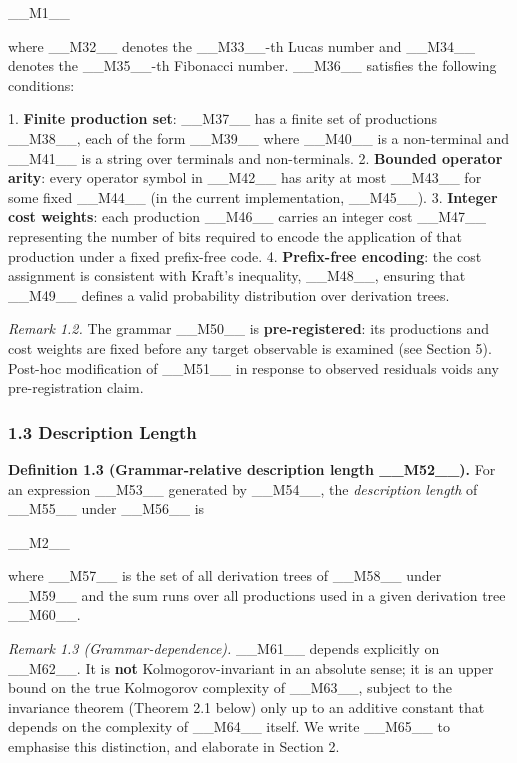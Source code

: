 \_\_M1\_\_

where \_\_M32\_\_ denotes the \_\_M33\_\_-th Lucas number and \_\_M34\_\_ denotes the \_\_M35\_\_-th Fibonacci number. \_\_M36\_\_ satisfies the following conditions:

1. \textbf{Finite production set}: \_\_M37\_\_ has a finite set of productions \_\_M38\_\_, each of the form \_\_M39\_\_ where \_\_M40\_\_ is a non-terminal and \_\_M41\_\_ is a string over terminals and non-terminals.
2. \textbf{Bounded operator arity}: every operator symbol in \_\_M42\_\_ has arity at most \_\_M43\_\_ for some fixed \_\_M44\_\_ (in the current implementation, \_\_M45\_\_).
3. \textbf{Integer cost weights}: each production \_\_M46\_\_ carries an integer cost \_\_M47\_\_ representing the number of bits required to encode the application of that production under a fixed prefix-free code.
4. \textbf{Prefix-free encoding}: the cost assignment is consistent with Kraft's inequality, \_\_M48\_\_, ensuring that \_\_M49\_\_ defines a valid probability distribution over derivation trees.

\textit{Remark 1.2.} The grammar \_\_M50\_\_ is \textbf{pre-registered}: its productions and cost weights are fixed before any target observable is examined (see Section 5). Post-hoc modification of \_\_M51\_\_ in response to observed residuals voids any pre-registration claim.

\subsubsection{1.3 Description Length}

\textbf{Definition 1.3 (Grammar-relative description length \_\_M52\_\_).} For an expression \_\_M53\_\_ generated by \_\_M54\_\_, the \textit{description length} of \_\_M55\_\_ under \_\_M56\_\_ is

\_\_M2\_\_

where \_\_M57\_\_ is the set of all derivation trees of \_\_M58\_\_ under \_\_M59\_\_ and the sum runs over all productions used in a given derivation tree \_\_M60\_\_.

\textit{Remark 1.3 (Grammar-dependence).} \_\_M61\_\_ depends explicitly on \_\_M62\_\_. It is \textbf{not} Kolmogorov-invariant in an absolute sense; it is an upper bound on the true Kolmogorov complexity of \_\_M63\_\_, subject to the invariance theorem (Theorem 2.1 below) only up to an additive constant that depends on the complexity of \_\_M64\_\_ itself. We write \_\_M65\_\_ to emphasise this distinction, and elaborate in Section 2.


